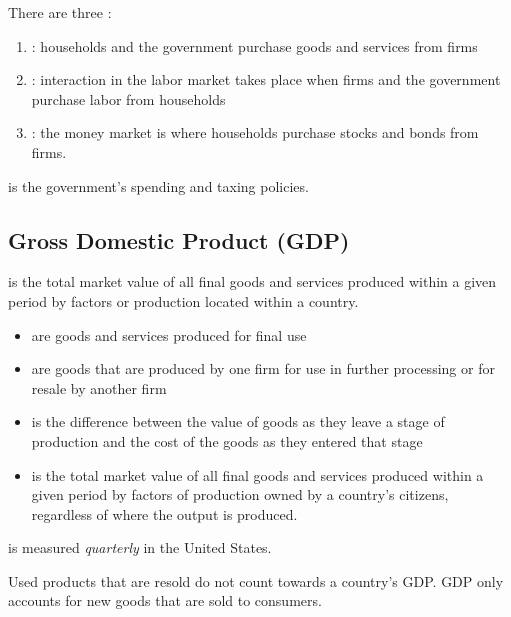 \documentclass{article}
\begin{document}
There are three :
\begin{enumerate}
  \item {}: households and the government purchase goods and services from firms 
  \item {}: interaction in the labor market takes place when firms and the government purchase labor from households 
  \item {}: the money market is where households purchase stocks and bonds from firms. 
\end{enumerate}

 is the government's spending and taxing policies.  \\ 

\subsection{Gross Domestic Product (GDP)}

 is the total market value of all final goods and services produced within a given period by factors or production located within a country. 
\begin{itemize}
  \item {} are goods and services produced for final use
  \item {} are goods that are produced by one firm for use in further processing or for resale by another firm
  \item {} is the difference between the value of goods as they leave a stage of production and the cost of the goods as they entered that stage
  \item {} is the total market value of all final goods and services produced within a given period by factors of production owned by a country's citizens, regardless of where the output is produced. 
\end{itemize}
 is measured \emph{quarterly} in the United States. 

\begin{remark}
  Used products that are resold do not count towards a country's GDP. GDP only accounts for new goods that are sold to consumers.
\end{remark}
\end{document}
